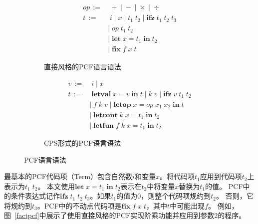 \begin{figure}[htbp]
        \centering
        \begin{subfigure}[b]{0.4\textwidth}
            \flushright
        \begin{equation}
            \nonumber
            \begin{aligned}
                op\, := &\; +\; |\; -\; | \; \times \; |\; \div \\
                t\, := &\; i\; |\; x\; |\; t_1\; t_2\; |\; \mathbf{ifz}\; t_1\; t_2\; t_3 \\
                & |\; op\; t_1\; t_2 \\
                & |\; \mathbf{let}\; x=t_1\; \mathbf{in}\; t_2 \\
                & |\; \mathbf{fix}\; f\; x\; t
            \end{aligned}
        \end{equation}
        \caption{直接风格的PCF语言语法}\label{directpcf}
        \end{subfigure}
        \begin{subfigure}[b]{0.5\textwidth}
            \flushleft
        \begin{equation}
            \nonumber
            \begin{aligned}
                v\, := &\; i\; |\; x \\
                t\, := &\; \mathbf{letval}\; x=v\; \mathbf{in}\; t\; |\; k\; v\; |\; \mathbf{ifz}\; v\; t_1\; t_2 \\
                & |\; f\; k\; v\; |\; \mathbf{letop}\; x=op\; x_1\; x_2\; \mathbf{in}\; t \\
                & |\; \mathbf{letcont}\; k\; x=t_1\; \mathbf{in}\; t_2 \\
                & |\; \mathbf{letfun}\; f\; k\; x=t_1\; \mathbf{in}\; t_2 
            \end{aligned}
        \end{equation}
        \caption{CPS形式的PCF语言语法}\label{cpspcf}
    \end{subfigure}
    \caption{PCF语言语法}\label{pcfsyntax}
    \end{figure}

最基本的PCF代码项（Term）包含自然数$i$和变量$x$。将代码项$t_1$应用到代码项$t_2$上表示为$t_1\; t_2$。
本文使用$\mathbf{let}\; x = t_1\; \mathbf{in}\; t_2$表示在$t_2$中将变量$x$替换为$t_1$的值。
PCF中的条件表达式记作$\mathbf{ifz}\; t_1\; t_2\; t_3$。如果$t_1$的值为0，则整个代码项规约到$t_2$。
否则，它将规约到$t_3$。PCF中的不动点代码项是$\mathbf{fix}\; f\; x\; t$，其中$t$中可能出现$f$。
例如，图~\ref{factpcf}中展示了使用直接风格的PCF实现阶乘功能并应用到参数2的程序。

